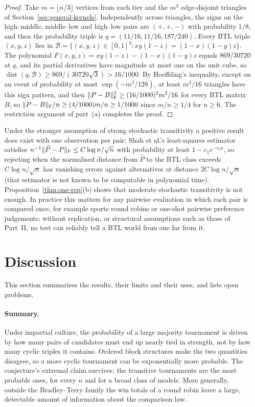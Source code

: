 \documentclass[11pt,a4paper]{article}
\theoremstyle{definition}
\begin{document}
\begin{proof}
Take $m=\lfloor n/3\rfloor$ vertices from each tier and the $m^2$ edge-disjoint triangles of Section~\ref{sec:general-kernels}. Independently across triangles, the signs on the high--middle, middle--low and high--low pairs are $(+,+,-)$ with probability $1/8$, and then the probability triple is $q=(11/16,11/16,187/240)$. Every BTL triple $(x,y,z)$ lies in $\mathcal B=\{(x,y,z)\in[0,1]^3:xy(1-z)=(1-x)(1-y)z\}$. The polynomial $F(x,y,z)=xy(1-z)-(1-x)(1-y)z$ equals $869/30720$ at $q$, and its partial derivatives have magnitude at most one on the unit cube, so $\operatorname{dist}(q,\mathcal B)\ge 869/(30720\sqrt3)>16/1000$. By Hoeffding's inequality, except on an event of probability at most $\exp(-m^2/128)$, at least $m^2/16$ triangles have this sign pattern, and then $\|P-B\|_{\rm F}^2\ge (16/1000)^2m^2/16$ for every BTL matrix $B$, so $\|P-B\|_{\rm F}/n\ge (4/1000)m/n\ge 1/1000$ since $m/n\ge1/4$ for $n\ge6$. The restriction argument of part~(a) completes the proof.
\end{proof}

Under the stronger assumption of strong stochastic transitivity a positive result does exist with one observation per pair: Shah et al.'s least-squares estimator \cite[Theorem~1 and (5b)]{sst} satisfies $n^{-1}\|\widehat P-P\|_{\rm F}\le C\log n/\sqrt n$ with probability at least $1-c_1 e^{-c_2 n}$, so rejecting when the normalised distance from $\widehat P$ to the BTL class exceeds $C\log n/\sqrt n$ has vanishing errors against alternatives at distance $2C\log n/\sqrt n$ (that estimator is not known to be computable in polynomial time). Proposition~\ref{thm:one-rep}(b) shows that moderate stochastic transitivity is not enough. In practice this matters for any pairwise evaluation in which each pair is compared once, for example sports round robins or one-shot pairwise preference judgements: without replication, or structural assumptions such as those of Part~II, no test can reliably tell a BTL world from one far from it.

\section{Discussion}\label{sec:discussion}

This section summarises the results, their limits and their uses, and lists open problems.

\paragraph{Summary.} Under impartial culture, the probability of a large majority tournament is driven by how many pairs of candidates must end up nearly tied in strength, not by how many cyclic triples it contains. Ordered block structures make the two quantities disagree, so a more cyclic tournament can be exponentially more probable. The conjecture's extremal claim survives: the transitive tournaments are the most probable ones, for every $n$ and for a broad class of models. More generally, outside the Bradley--Terry family the win totals of a round robin leave a large, detectable amount of information about the comparison law.
\end{document}
